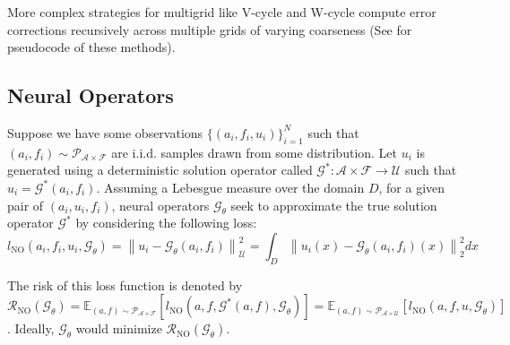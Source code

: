 \documentclass[12pt]{article}
\begin{document}
More complex strategies for multigrid like V-cycle and W-cycle compute error corrections recursively across multiple grids of varying coarseness (See  for pseudocode of these methods).



\subsection{Neural Operators} \label{sec:neuraloperators}

Suppose we have some observations $\{(a_i, f_i, u_i)\}_{i = 1}^N$ such that $(a_i, f_i) \sim \mathcal{P}_{\mathcal{A} \times \mathcal{F}}$ are i.i.d. samples drawn from some distribution. Let $u_i$ is generated using a deterministic solution operator called $\mathcal{G}^{*} : \mathcal{A} \times \mathcal{F} \to \mathcal{U}$ such that $u_i = \mathcal{G}^{*}(a_i, f_i)$. Assuming a Lebesgue measure over the domain $D$, for a given pair of $(a_i, u_i, f_i)$, neural operators  $\mathcal{G}_{\theta}$ seek to approximate the true solution operator $\mathcal{G}^*$ by considering the following loss:
\begin{equation} \label{eq:NOloss}
    l_{\text{NO}}(a_i, f_i, u_i, \mathcal{G}_{\theta}) = \left\|u_i - \mathcal{G}_{\theta}(a_i, f_i)\right\|^2_{\mathcal{U}} = \int_{D} \left\|u_i(x) - \mathcal{G}_{\theta}(a_i, f_i)(x)\right\|_2^2dx
\end{equation}

The risk of this loss function is denoted by $\mathcal{R}_{\text{NO}}(\mathcal{G}_{\theta}) = \mathbb{E}_{(a, f) \sim  \mathcal{P}_{\mathcal{A} \times \mathcal{F}}}\left[l_{\text{NO}}(a, f, \mathcal{G}^{*}(a, f), \mathcal{G}_{\theta})\right] = \mathbb{E}_{(a, f) \sim  \mathcal{P}_{\mathcal{A} \times \mathcal{U}}}\left[l_{\text{NO}}(a, f, u, \mathcal{G}_{\theta})\right]$. Ideally, $\mathcal{G}_{\theta}$ would minimize $\mathcal{R}_{\text{NO}}(\mathcal{G}_{\theta})$.
\end{document}
